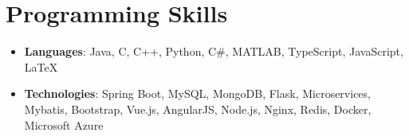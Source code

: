 \documentclass[letterpaper,11pt]{article}
\makeatletter
\newcommand{\resumeItem}[2]{
  \item\small{
    \textbf{#1}{: #2 \vspace{-2pt}}
  }
}
\newcommand{\awardSubItem}[2]{
  \item
    \begin{tabular*}{0.97\textwidth}{l@{\extracolsep{\fill}}r}
      \textbf{\small #1} & \textit{\small #2} \\
    \end{tabular*}\vspace{-8pt}
}
\newcommand{\resumeSubItem}[2]{\resumeItem{#1}{#2}\vspace{-4pt}}
\newcommand{\resumeSubHeadingListStart}{\begin{itemize}[leftmargin=*]}
\newcommand{\resumeSubHeadingListEnd}{\end{itemize}}
\makeatother
\begin{document}

\section{Programming Skills}
  \resumeSubHeadingListStart
    \resumeSubItem{Languages}
      {Java, C, C++, Python, C\#, MATLAB, TypeScript, JavaScript, \LaTeX} \\
    \resumeSubItem{Technologies}
      {Spring Boot, MySQL, MongoDB, Flask, Microservices, Mybatis, Bootstrap, Vue.js, AngularJS, Node.js, Nginx, Redis, Docker, Microsoft Azure} 
  \resumeSubHeadingListEnd


\end{document}
